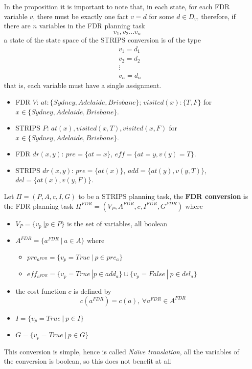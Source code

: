 \documentclass[10pt, letterpaper]{report}
\begin{document}
In the proposition it is important to note that, in each state, for each FDR variable $v$, there must be exactly one fact $v=d$ for some $d\in D_v$, therefore, if there are $n$ variables in the FDR planning task $$v_1,v_2\dots v_n $$a state of the state space of the STRIPS conversion is of the type\begin{align*}
    &v_1=d_1\\ &v_2=d_2\\ &\vdots \\ &v_n=d_n
\end{align*}
that is, each variable must have a single assignment.
\begin{itemize}
    \item FDR $V$: $at : \{Sydney, Adelaide, Brisbane\}$; $visited(x) : \{T, F\}$ for $x \in \{Sydney, Adelaide, Brisbane\}$.
    \item STRIPS $P$: $at(x), visited(x, T), visited(x, F)$ for $x \in \{Sydney, Adelaide, Brisbane\}$.
    \item FDR $dr(x, y)$: $pre = \{at = x\}$, $eff = \{at = y, v(y) = T\}$.
    \item STRIPS $dr(x, y)$: $pre = \{at(x)\}$, $add = \{at(y), v(y, T)\}$, $del = \{at(x), v(y, F)\}$.
\end{itemize}
\begin{definition}\label{STRIPS2FDR}
    Let $\Pi=(P,A,c,I,G)$ to be a STRIPS planning task, the \textbf{FDR conversion} is the FDR planning task $\Pi^{FDR}=(V_P,A^{FDR},c,I^{FDR},G^{FDR})$ where
\end{definition}\begin{itemize}
    \item $V_P=\{v_p \ | p\in P\}$ is the set of variables, all boolean
    \item $A^{FDR}=\{a^{FDR} \ | \ a\in A\}$ where\begin{itemize}
        \item $pre_{a^{FDR}}=\{v_p=True \ | \ p\in pre_a\}$
        \item $eff_{a^{FDR}}=\{v_p=True \ | p \in add_a\}\cup\{v_p=False \ | \ p\in del_a\}$
    \end{itemize}
    \item the cost function $c$ is defined by $$c(a^{FDR})=c(a),\ \forall a^{FDR}\in A^{FDR} $$
    \item $I=\{v_p=True \ | \ p\in I\}$
    \item $G=\{v_p=True \ | \ p\in G\}$
\end{itemize}
This conversion is simple, hence is called \textit{Na\"{\i}ve translation}, all the variables of the conversion is boolean, so this does not benefit at all
\end{document}
